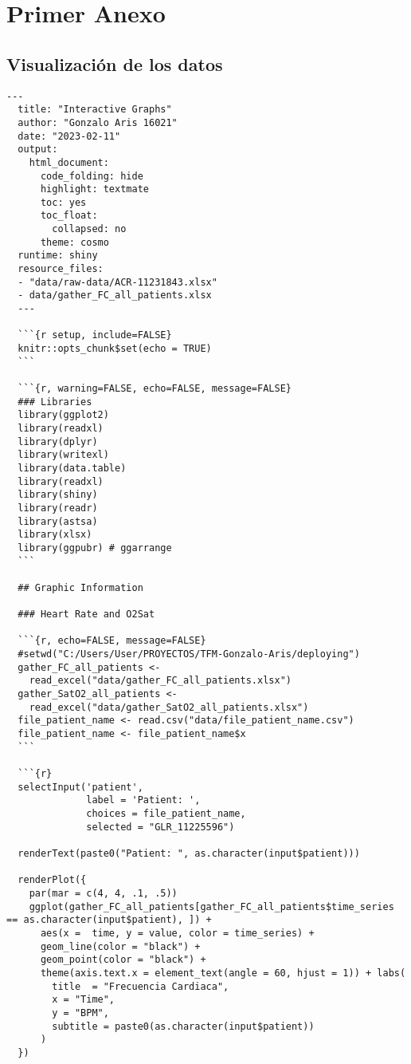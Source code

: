 \section{Primer Anexo}\label{sec:anexo1}

\subsection{Visualización de los datos}\label{sec:codigo-visualizacion}
\lstset{style=mystyle2} 
\begin{lstlisting}[style=mystyle2,caption={Código Visualización de los Datos}, label={lst:codigo-visualizacion}]
  ---
  title: "Interactive Graphs"
  author: "Gonzalo Aris 16021"
  date: "2023-02-11"
  output:
    html_document:
      code_folding: hide
      highlight: textmate
      toc: yes
      toc_float:
        collapsed: no
      theme: cosmo
  runtime: shiny
  resource_files:
  - "data/raw-data/ACR-11231843.xlsx"
  - data/gather_FC_all_patients.xlsx
  ---
  
  ```{r setup, include=FALSE}
  knitr::opts_chunk$set(echo = TRUE)
  ```
  
  ```{r, warning=FALSE, echo=FALSE, message=FALSE}
  ### Libraries
  library(ggplot2)
  library(readxl)
  library(dplyr)
  library(writexl)
  library(data.table)
  library(readxl)
  library(shiny)
  library(readr)
  library(astsa)
  library(xlsx)
  library(ggpubr) # ggarrange
  ```
  
  ## Graphic Information
  
  ### Heart Rate and O2Sat
  
  ```{r, echo=FALSE, message=FALSE}
  #setwd("C:/Users/User/PROYECTOS/TFM-Gonzalo-Aris/deploying")
  gather_FC_all_patients <-
    read_excel("data/gather_FC_all_patients.xlsx")
  gather_SatO2_all_patients <-
    read_excel("data/gather_SatO2_all_patients.xlsx")
  file_patient_name <- read.csv("data/file_patient_name.csv")
  file_patient_name <- file_patient_name$x 
  ```
  
  ```{r}
  selectInput('patient',
              label = 'Patient: ',
              choices = file_patient_name,
              selected = "GLR_11225596")
  
  renderText(paste0("Patient: ", as.character(input$patient)))
  
  renderPlot({
    par(mar = c(4, 4, .1, .5))
    ggplot(gather_FC_all_patients[gather_FC_all_patients$time_series == as.character(input$patient), ]) +
      aes(x =  time, y = value, color = time_series) +
      geom_line(color = "black") +
      geom_point(color = "black") +
      theme(axis.text.x = element_text(angle = 60, hjust = 1)) + labs(
        title  = "Frecuencia Cardiaca",
        x = "Time",
        y = "BPM",
        subtitle = paste0(as.character(input$patient))
      )
  })
  

\end{lstlisting}
